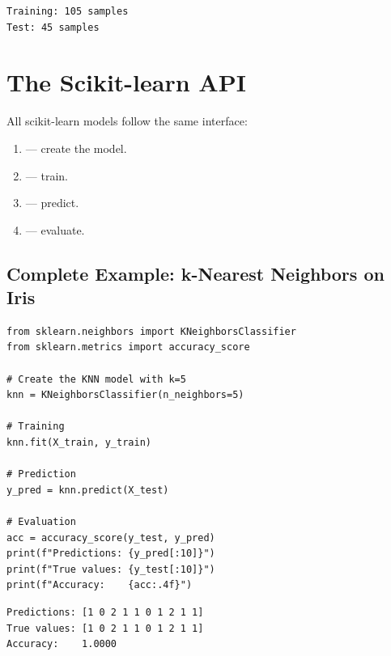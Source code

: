 \begin{codeoutput}
\begin{verbatim}
Training: 105 samples
Test: 45 samples
\end{verbatim}
\end{codeoutput}

\section{The Scikit-learn API}
\label{sec:api_sklearn}


\begin{bestpractice}
All scikit-learn models follow the same interface:
\begin{enumerate}
    \item {} --- create the model.
    \item {} --- train.
    \item {} --- predict.
    \item {} --- evaluate.
\end{enumerate}
\end{bestpractice}

\subsection{Complete Example: k-Nearest Neighbors on Iris}


\begin{codeblock}[title=\textbf{Python}]
\begin{verbatim}
from sklearn.neighbors import KNeighborsClassifier
from sklearn.metrics import accuracy_score

# Create the KNN model with k=5
knn = KNeighborsClassifier(n_neighbors=5)

# Training
knn.fit(X_train, y_train)

# Prediction
y_pred = knn.predict(X_test)

# Evaluation
acc = accuracy_score(y_test, y_pred)
print(f"Predictions: {y_pred[:10]}")
print(f"True values: {y_test[:10]}")
print(f"Accuracy:    {acc:.4f}")
\end{verbatim}
\end{codeblock}

\begin{codeoutput}
\begin{verbatim}
Predictions: [1 0 2 1 1 0 1 2 1 1]
True values: [1 0 2 1 1 0 1 2 1 1]
Accuracy:    1.0000
\end{verbatim}
\end{codeoutput}

